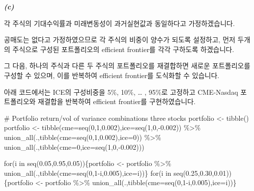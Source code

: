 \documentclass[
  a4paper,
  DIV=11,
  numbers=noendperiod]{scrreprt}
\newenvironment{Shaded}{\begin{snugshade}}{\end{snugshade}}
\newcommand{\AttributeTok}[1]{\textcolor[rgb]{0.40,0.45,0.13}{#1}}
\newcommand{\CommentTok}[1]{\textcolor[rgb]{0.37,0.37,0.37}{#1}}
\newcommand{\ControlFlowTok}[1]{\textcolor[rgb]{0.00,0.23,0.31}{#1}}
\newcommand{\DecValTok}[1]{\textcolor[rgb]{0.68,0.00,0.00}{#1}}
\newcommand{\FloatTok}[1]{\textcolor[rgb]{0.68,0.00,0.00}{#1}}
\newcommand{\FunctionTok}[1]{\textcolor[rgb]{0.28,0.35,0.67}{#1}}
\newcommand{\NormalTok}[1]{\textcolor[rgb]{0.00,0.23,0.31}{#1}}
\newcommand{\OtherTok}[1]{\textcolor[rgb]{0.00,0.23,0.31}{#1}}
\newcommand{\SpecialCharTok}[1]{\textcolor[rgb]{0.37,0.37,0.37}{#1}}
\begin{document}
\textbf{\emph{(c)}}

각 주식의 기대수익률과 미래변동성이 과거실현값과 동일하다고
가정하겠습니다.

공매도는 없다고 가정하였으므로 각 주식의 비중이 양수가 되도록 설정하고,
먼저 두개의 주식으로 구성된 포트폴리오의 efficient frontier를 각각
구하도록 하겠습니다.

그 다음, 하나의 주식과 다른 두 주식의 포트폴리오를 재결합하면 새로운
포트폴리오를 구성할 수 있으며, 이를 반복하여 efficient frontier를
도식화할 수 있습니다.

아래 코드에서는 ICE의 구성비중을 5\%, 10\%, \ldots{} , 95\%로 고정하고
CME-Nasdaq 포트폴리오와 재결합을 반복하여 efficient frontier를
구현하였습니다.

\begin{Shaded}
\begin{Highlighting}[]
\CommentTok{\# Portfolio return/vol of variance combinations three stocks}
\NormalTok{portfolio }\OtherTok{\textless{}{-}} \FunctionTok{tibble}\NormalTok{()}
\NormalTok{portfolio }\OtherTok{\textless{}{-}} \FunctionTok{tibble}\NormalTok{(}\AttributeTok{cme=}\FunctionTok{seq}\NormalTok{(}\DecValTok{0}\NormalTok{,}\DecValTok{1}\NormalTok{,}\FloatTok{0.002}\NormalTok{),}\AttributeTok{ice=}\FunctionTok{seq}\NormalTok{(}\DecValTok{1}\NormalTok{,}\DecValTok{0}\NormalTok{,}\SpecialCharTok{{-}}\FloatTok{0.002}\NormalTok{)) }\SpecialCharTok{\%\textgreater{}\%} 
  \FunctionTok{union\_all}\NormalTok{(.,}\FunctionTok{tibble}\NormalTok{(}\AttributeTok{cme=}\FunctionTok{seq}\NormalTok{(}\DecValTok{0}\NormalTok{,}\DecValTok{1}\NormalTok{,}\FloatTok{0.002}\NormalTok{),}\AttributeTok{ice=}\DecValTok{0}\NormalTok{)) }\SpecialCharTok{\%\textgreater{}\%} 
  \FunctionTok{union\_all}\NormalTok{(.,}\FunctionTok{tibble}\NormalTok{(}\AttributeTok{cme=}\DecValTok{0}\NormalTok{,}\AttributeTok{ice=}\FunctionTok{seq}\NormalTok{(}\DecValTok{1}\NormalTok{,}\DecValTok{0}\NormalTok{,}\SpecialCharTok{{-}}\FloatTok{0.002}\NormalTok{)))}

\ControlFlowTok{for}\NormalTok{(i }\ControlFlowTok{in} \FunctionTok{seq}\NormalTok{(}\FloatTok{0.05}\NormalTok{,}\FloatTok{0.95}\NormalTok{,}\FloatTok{0.05}\NormalTok{))\{portfolio }\OtherTok{\textless{}{-}}\NormalTok{ portfolio }\SpecialCharTok{\%\textgreater{}\%}
  \FunctionTok{union\_all}\NormalTok{(.,}\FunctionTok{tibble}\NormalTok{(}\AttributeTok{cme=}\FunctionTok{seq}\NormalTok{(}\DecValTok{0}\NormalTok{,}\DecValTok{1}\SpecialCharTok{{-}}\NormalTok{i,}\FloatTok{0.005}\NormalTok{),}\AttributeTok{ice=}\NormalTok{i))\}}
\ControlFlowTok{for}\NormalTok{(i }\ControlFlowTok{in} \FunctionTok{seq}\NormalTok{(}\FloatTok{0.25}\NormalTok{,}\FloatTok{0.30}\NormalTok{,}\FloatTok{0.01}\NormalTok{))\{portfolio }\OtherTok{\textless{}{-}}\NormalTok{ portfolio }\SpecialCharTok{\%\textgreater{}\%}
  \FunctionTok{union\_all}\NormalTok{(.,}\FunctionTok{tibble}\NormalTok{(}\AttributeTok{cme=}\FunctionTok{seq}\NormalTok{(}\DecValTok{0}\NormalTok{,}\DecValTok{1}\SpecialCharTok{{-}}\NormalTok{i,}\FloatTok{0.005}\NormalTok{),}\AttributeTok{ice=}\NormalTok{i))\}}


\end{Highlighting}
\end{Shaded}
\end{document}
